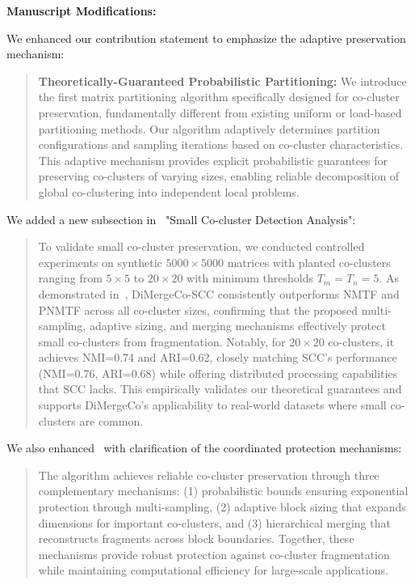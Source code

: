 \documentclass{ar2rc}
\begin{document}
\textbf{Manuscript Modifications:}

We enhanced our contribution statement to emphasize the adaptive preservation mechanism:

\begin{quote}
  \textbf{Theoretically-Guaranteed Probabilistic Partitioning:} We introduce the first matrix partitioning algorithm specifically designed for co-cluster preservation, fundamentally different from existing uniform or load-based partitioning methods. Our algorithm adaptively determines partition configurations and sampling iterations based on co-cluster characteristics. This adaptive mechanism provides explicit probabilistic guarantees for preserving co-clusters of varying sizes, enabling reliable decomposition of global co-clustering into independent local problems.
\end{quote}

We added a new subsection in~ "Small Co-cluster Detection Analysis":

\begin{quote}
  To validate small co-cluster preservation, we conducted controlled experiments on synthetic $5000 \times 5000$ matrices with planted co-clusters ranging from $5 \times 5$ to $20 \times 20$ with minimum thresholds $T_m = T_n = 5$. As demonstrated in~, DiMergeCo-SCC consistently outperforms NMTF and PNMTF across all co-cluster sizes, confirming that the proposed multi-sampling, adaptive sizing, and merging mechanisms effectively protect small co-clusters from fragmentation. Notably, for $20 \times 20$ co-clusters, it achieves NMI=0.74 and ARI=0.62, closely matching SCC's performance (NMI=0.76, ARI=0.68) while offering distributed processing capabilities that SCC lacks. This empirically validates our theoretical guarantees and supports DiMergeCo's applicability to real-world datasets where small co-clusters are common.
\end{quote}

We also enhanced~ with clarification of the coordinated protection mechanisms:

\begin{quote}
  The algorithm achieves reliable co-cluster preservation through three complementary mechanisms: (1) probabilistic bounds ensuring exponential protection through multi-sampling, (2) adaptive block sizing that expands dimensions for important co-clusters, and (3) hierarchical merging that reconstructs fragments across block boundaries. Together, these mechanisms provide robust protection against co-cluster fragmentation while maintaining computational efficiency for large-scale applications.
\end{quote}
\end{document}

